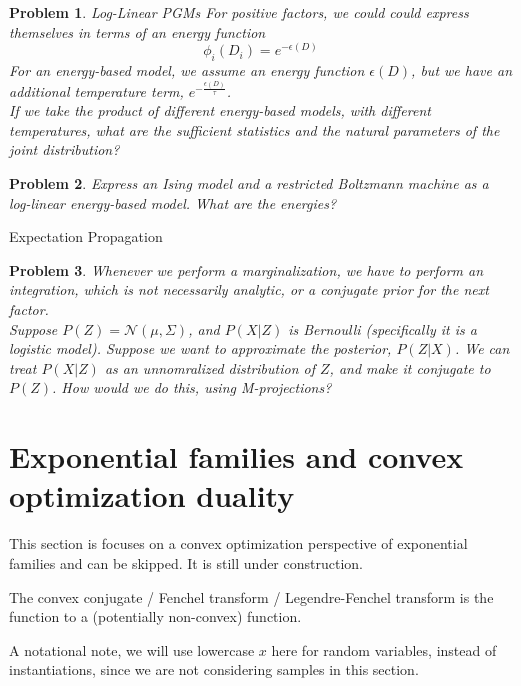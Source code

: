 \documentclass[a4paper]{article}
\newtheorem{problem}{Problem}[section]
\begin{document}
\begin{problem} Log-Linear PGMs
  For positive factors, we could could express themselves in terms of an energy function
  \begin{equation}
    \phi_i(D_i) = e^{ - \epsilon(D)}
    \label{EBM}
  \end{equation}
  For an energy-based model, we assume an energy function $\epsilon(D)$, but we have an additional temperature term, $e^{-\frac{\epsilon(D)}{\tau}}$. \\
  If we take the product of different energy-based models, with different temperatures, what are the sufficient statistics and the natural parameters of the joint distribution?
\end{problem}

\begin{problem}
  Express an Ising model and a restricted Boltzmann machine as a log-linear energy-based model.  What are the energies?  
\end{problem}

Expectation Propagation
\begin{problem}
  Whenever we perform a marginalization, we have to perform an integration, which is not necessarily analytic, or a conjugate prior for the next factor. \\
  Suppose $P(Z) = \mathcal{N}(\mu,\Sigma)$, and $P(X \vert Z)$ is Bernoulli (specifically it is a logistic model).  Suppose we want to approximate the posterior, $P(Z \vert X)$.  We can treat $P(X \vert Z)$ as an unnomralized distribution of $Z$, and make it conjugate to $P(Z)$.  How would we do this, using M-projections?  \\
\end{problem}

\section{Exponential families and convex optimization duality}

This section is focuses on a convex optimization perspective of exponential families and can be skipped.  It is still under construction.

The convex conjugate / Fenchel transform / Legendre-Fenchel transform is the function to a (potentially non-convex) function.

A notational note, we will use lowercase $x$ here for random variables, instead of instantiations, since we are not considering samples in this section.
\end{document}
